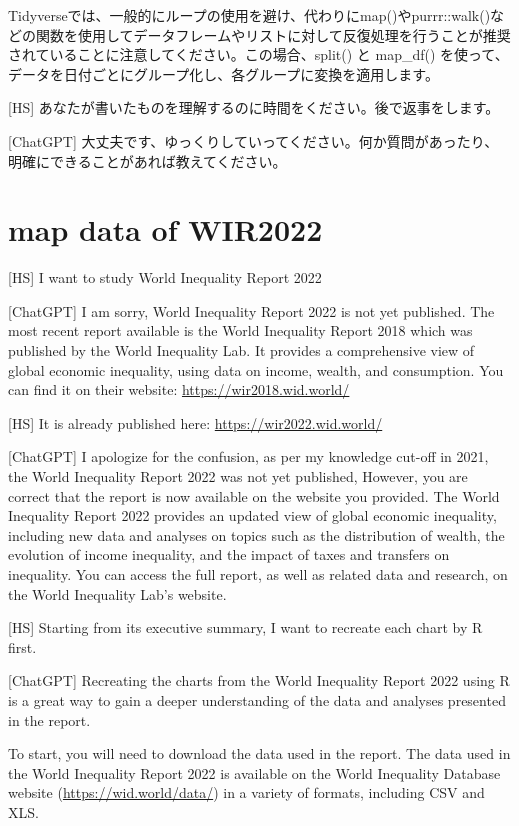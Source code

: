 \documentclass[
]{book}
\theoremstyle{definition}
\theoremstyle{definition}
\theoremstyle{definition}
\theoremstyle{definition}
\theoremstyle{remark}
\begin{document}
Tidyverseでは、一般的にループの使用を避け、代わりにmap()やpurrr::walk()などの関数を使用してデータフレームやリストに対して反復処理を行うことが推奨されていることに注意してください。この場合、split() と map\_df() を使って、データを日付ごとにグループ化し、各グループに変換を適用します。

{[}HS{]} あなたが書いたものを理解するのに時間をください。後で返事をします。

{[}ChatGPT{]} 大丈夫です、ゆっくりしていってください。何か質問があったり、明確にできることがあれば教えてください。

\hypertarget{mapdataofwir2022}{%
\section{map data of WIR2022}\label{mapdataofwir2022}}

{[}HS{]} I want to study World Inequality Report 2022

{[}ChatGPT{]} I am sorry, World Inequality Report 2022 is not yet published. The most recent report available is the World Inequality Report 2018 which was published by the World Inequality Lab. It provides a comprehensive view of global economic inequality, using data on income, wealth, and consumption. You can find it on their website: \url{https://wir2018.wid.world/}

{[}HS{]} It is already published here: \url{https://wir2022.wid.world/}

{[}ChatGPT{]} I apologize for the confusion, as per my knowledge cut-off in 2021, the World Inequality Report 2022 was not yet published, However, you are correct that the report is now available on the website you provided. The World Inequality Report 2022 provides an updated view of global economic inequality, including new data and analyses on topics such as the distribution of wealth, the evolution of income inequality, and the impact of taxes and transfers on inequality. You can access the full report, as well as related data and research, on the World Inequality Lab's website.

{[}HS{]} Starting from its executive summary, I want to recreate each chart by R first.

{[}ChatGPT{]} Recreating the charts from the World Inequality Report 2022 using R is a great way to gain a deeper understanding of the data and analyses presented in the report.

To start, you will need to download the data used in the report. The data used in the World Inequality Report 2022 is available on the World Inequality Database website (\url{https://wid.world/data/}) in a variety of formats, including CSV and XLS.
\end{document}
